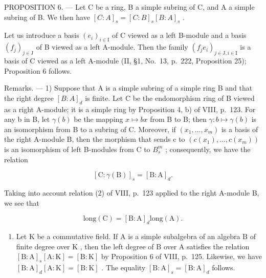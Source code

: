 PROPOSITION 6. --- Let C be a ring, B a simple subring of C, and A a simple subring of B. We then have \([C:A]_{s} = [C:B]_{s}[B:A]_{s}\) .

Let us introduce a basis \((e_{i})_{i\in\mathrm{I}}\) of C viewed as a left B-module and a basis \((f_{j})_{j\in\mathrm{J}}\) of B viewed as a left A-module. Then the family \((f_{j}e_{i})_{j\in\mathrm{J},i\in\mathrm{I}}\) is a basis of C viewed as a left A-module (II, §1, No.~13, p.~222, Proposition 25); Proposition 6 follows.

Remarks. --- 1) Suppose that A is a simple subring of a simple ring B and that the right degree \([B : A]_{d}\) is finite. Let C be the endomorphism ring of B viewed as a right A-module; it is a simple ring by Proposition 4, b) of VIII, p.~123. For any b in B, let \(\gamma(b)\) be the mapping \(x \mapsto bx\) from B to B; then \(\gamma : b \mapsto \gamma(b)\) is an isomorphism from B to a subring of C. Moreover, if \((x_{1}, \ldots, x_{m})\) is a basis of the right A-module B, then the morphism that sends c to \((c(x_{1}), \ldots, c(x_{m}))\) is an isomorphism of left B-modules from C to \(B_{s}^{m}\) ; consequently, we have the relation

\[
[ \mathrm{C}: \gamma (\mathrm{B}) ] _ {s} = [ \mathrm{B}: \mathrm{A} ] _ {d}.\tag{4}
\]

Taking into account relation (2) of VIII, p.~123 applied to the right A-module B, we see that

\[
\mathrm{long} (\mathrm{C}) = [ \mathrm{B}: \mathrm{A} ] _ {d} \mathrm{long} (\mathrm{A}).\tag{5}
\]

\begin{enumerate}
\def\labelenumi{\arabic{enumi})}
\setcounter{enumi}{1}
\tightlist
\item
  Let \(\mathrm{K}\) be a commutative field. If \(\mathrm{A}\) is a simple subalgebra of an algebra \(\mathrm{B}\) of finite degree over \(\mathrm{K}\) , then the left degree of \(\mathrm{B}\) over \(\mathrm{A}\) satisfies the relation \(\left[\mathrm{B}:\mathrm{A}\right]_s[\mathrm{A}:\mathrm{K}] = [\mathrm{B}:\mathrm{K}]\) by Proposition 6 of VIII, p.~125. Likewise, we have \(\left[\mathrm{B}:\mathrm{A}\right]_d[\mathrm{A}:\mathrm{K}] = [\mathrm{B}:\mathrm{K}]\) . The equality \(\left[\mathrm{B}:\mathrm{A}\right]_s = \left[\mathrm{B}:\mathrm{A}\right]_d\) follows.
\end{enumerate}

